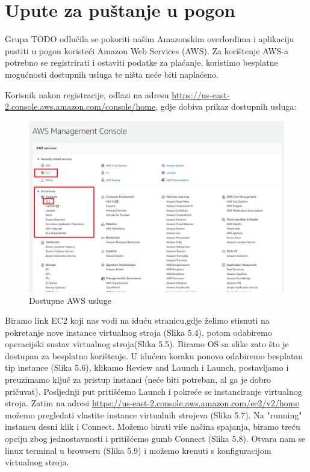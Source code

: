 			\eject 
		
		\section{Upute za puštanje u pogon}
		
			Grupa TODO odlučila se pokoriti našim Amazonskim overlordima i aplikaciju pustiti u pogon koristeći Amazon Web Services (AWS). Za korištenje AWS-a potrebno se registrirati i ostaviti podatke za plaćanje, koristimo besplatne mogućnosti dostupnih usluga te ništa neće biti naplaćeno. 
			
			Korisnik nakon registracije, odlazi na adresu \url{https://us-east-2.console.aws.amazon.com/console/home}, gdje dobiva prikaz dostupnih usluga:
			
			\begin{figure}[h]
				\includegraphics[scale=0.5]{slike/deployment_slike/awshome.png}
				\centering
				\caption{Dostupne AWS usluge}
				
			\end{figure}
		
			Biramo link EC2  koji nas vodi na iduću stranicu,gdje želimo stisnuti na pokretanje nove instance virtualnog stroja (Slika 5.4), potom odabiremo operacijski sustav virtualnog stroja(Slika 5.5). Biramo OS sa slike zato što je dostupan za besplatno korištenje. U idućem koraku ponovo odabiremo besplatan tip instance (Slika 5.6), klikamo Review and Launch i Launch, postavljamo i preuzimamo ključ za pristup instanci (neće biti potreban, al ga je dobro pričuvat). Posljednji put pritišćemo Launch i pokreće se instanciranje virtualnog stroja. Zatim na adresi \url{https://us-east-2.console.aws.amazon.com/ec2/v2/home} možemo pregledati vlastite instance virtualnih strojeva (Slika 5.7). Na "running" instancu desni klik i Connect. Možemo birati više načina spajanja, biramo treću opciju zbog jednostavnosti i pritišćemo gumb Connect (Slika 5.8). Otvara nam se linux terminal u browseru (Slika 5.9) i možemo krenuti s konfiguracijom virtualnog stroja.
			
